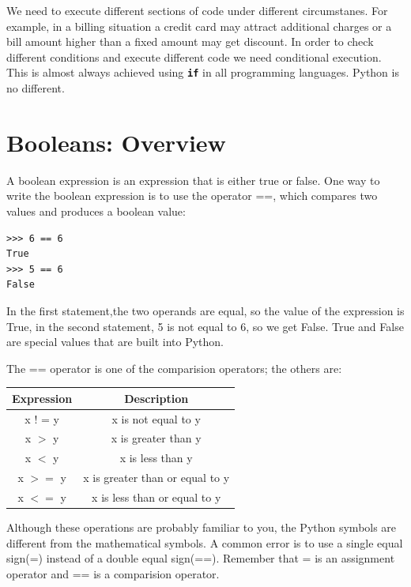 \documentclass[11pt,a4paper]{article}
\author{TalentSprint}
\date{}
\newcommand{\Code}[1]{\textbf{\texttt{#1}}}
\begin{document}

We need to execute different sections of code under different circumstanes. For example, in a billing situation a credit card may attract additional charges or a bill amount higher than a fixed amount may get discount.  In order to check different conditions and execute different code we need conditional execution. This is almost always achieved using \Code{if} in all programming languages. Python is no different.

\section*{Booleans:  Overview}
A boolean expression is an expression that is either true or false. One way to write the boolean expression is to use the operator ==, which compares two values and produces a boolean value:
\begin{verbatim}
>>> 6 == 6
True
>>> 5 == 6
False
\end{verbatim}
In the first statement,the two operands are equal, so the value of the expression is True, in the second statement, 5 is not equal to 6, so we get False. True and False are special values that are built into Python.

The == operator is one of the comparision operators; the others are:

\begin{table}[ht]
\centering
\begin{tabular}{|c|c|}\hline
\textbf{Expression}    &    \textbf{Description}\\\hline
x ! = y     &      x is not equal to y\\\hline
x $>$ y        &     x is greater than y\\\hline
x $<$ y        &     x is less than y\\\hline
x $>=$ y      &    x is greater than or equal to y\\\hline
x $<=$ y      &    x is less than or equal to y\\\hline
\end{tabular}
\end{table}
Although these operations are probably familiar to you, the Python symbols are different from the mathematical symbols.
A common error is to use a single equal sign(=) instead of a double equal sign(==). Remember that = is an assignment operator and  == is a comparision operator.
\end{document}
